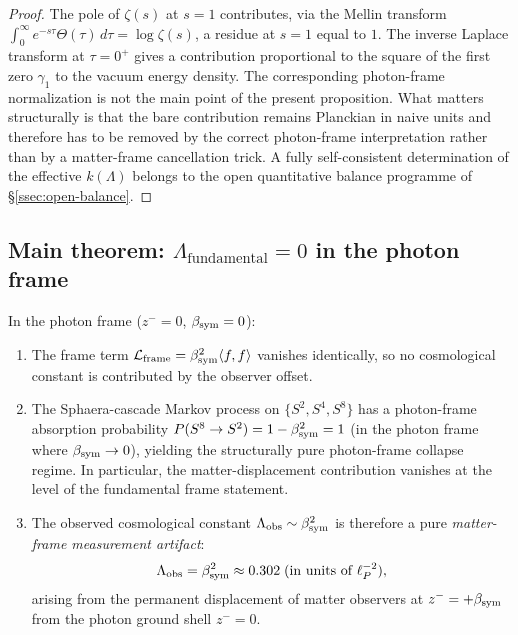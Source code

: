 \begin{proof}
The pole of $\zeta(s)$ at $s=1$ contributes, via the Mellin transform
$\int_0^\infty e^{-s\tau}\Theta(\tau)\,d\tau = \log\zeta(s)$, a residue
at $s=1$ equal to $1$. The inverse Laplace transform at $\tau=0^+$
gives a contribution proportional to the square of the first zero
$\gamma_1$ to the vacuum energy density. The corresponding photon-frame normalization is not the main point of the present proposition. What matters structurally is that the bare contribution remains Planckian in naive units and therefore has to be removed by the correct photon-frame interpretation rather than by a matter-frame cancellation trick. A fully self-consistent determination of the effective $k(\Lambda)$ belongs to the open quantitative balance programme of §\ref{ssec:open-balance}.
\end{proof}

\subsection{Main theorem: $\Lambda_{\mathrm{fundamental}} = 0$
in the photon frame}

\begin{theorem}
\label{thm:lambda-zero}
In the photon frame ($z^- = 0$, $\beta_{\mathrm{sym}} = 0$):
\begin{enumerate}
\item[(i)] The frame term $\mathcal{L}_{\mathrm{frame}} = \beta_{\mathrm{sym}}^2
  \langle f,f\rangle$ vanishes identically, so no cosmological
  constant is contributed by the observer offset.
\item[(ii)] The Sphaera-cascade Markov process on $\{S^2, S^4, S^8\}$
  has a photon-frame absorption probability
  $P(S^8 \to S^2) = 1 - \beta_{\mathrm{sym}}^2 = 1$ (in the photon frame
  where $\beta_{\mathrm{sym}}\to 0$), yielding the structurally pure photon-frame collapse regime. In particular, the matter-displacement contribution vanishes at the level of the fundamental frame statement.
\item[(iii)] The observed cosmological constant
  $\Lambda_{\mathrm{obs}} \sim \beta_{\mathrm{sym}}^2$ is therefore a pure
  \emph{matter-frame measurement artifact}:
  \[
    \Lambda_{\mathrm{obs}}
    = \beta_{\mathrm{sym}}^2 \approx 0.302\;(\text{in units of }\ell_P^{-2}),
  \]
  arising from the permanent displacement of matter observers at
  $z^- = +\beta_{\mathrm{sym}}$ from the photon ground shell $z^- = 0$.
\end{enumerate}
\end{theorem}

